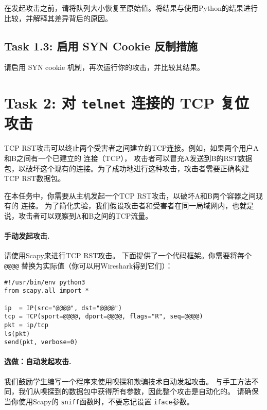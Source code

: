 在发起攻击之前，请将队列大小恢复至原始值。将结果与使用Python的结果进行比较，并解释其差异背后的原因。

 



\subsection{Task 1.3: 启用 SYN Cookie 反制措施}

请启用 SYN cookie 机制，再次运行你的攻击，并比较其结果。



\section {Task 2: 对 \texttt{telnet} 连接的 TCP 复位攻击}

TCP RST攻击可以终止两个受害者之间建立的TCP连接。例如，如果两个用户A和B之间有一个已建立的 \telnet 连接（TCP），
攻击者可以冒充A发送到B的RST数据包，以破坏这个现有的连接。为了成功地进行这种攻击，攻击者需要正确构建TCP RST数据包。

在本任务中，你需要从主机发起一个TCP RST攻击，以破坏A和B两个容器之间现有的 \telnet 连接。
为了简化实验，我们假设攻击者和受害者在同一局域网内，也就是说，攻击者可以观察到A和B之间的TCP流量。

\paragraph{手动发起攻击.} 
请使用Scapy来进行TCP RST攻击。
下面提供了一个代码框架。你需要将每个 \texttt{@@@@} 替换为实际值（你可以用Wireshark得到它们）：


\begin{lstlisting}
#!/usr/bin/env python3
from scapy.all import *

ip  = IP(src="@@@@", dst="@@@@")
tcp = TCP(sport=@@@@, dport=@@@@, flags="R", seq=@@@@)
pkt = ip/tcp
ls(pkt)
send(pkt, verbose=0)
\end{lstlisting}

\paragraph{选做：自动发起攻击.} 
我们鼓励学生编写一个程序来使用嗅探和欺骗技术自动发起攻击。
与手工方法不同，我们从嗅探到的数据包中获得所有参数，因此整个攻击是自动化的。 
请确保当你使用Scapy的 \texttt{sniff}函数时，不要忘记设置 \texttt{iface}参数。

